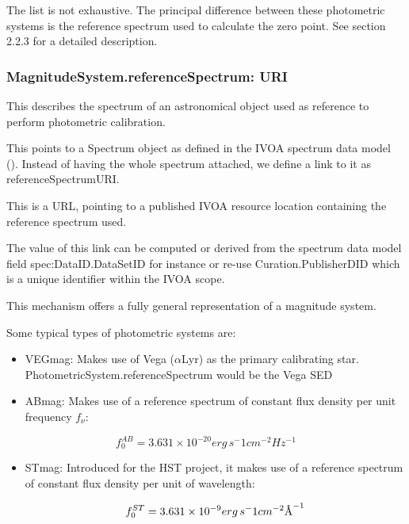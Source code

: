 \documentclass[11pt,a4paper]{ivoa}
\newcommand{\angstrom}{\mbox{\normalfont\AA}}
\begin{document}

The list is not exhaustive. The principal difference between these photometric systems is the reference spectrum used to calculate the zero point. See section 2.2.3 for a detailed description.
\par

\subsubsection{MagnitudeSystem.referenceSpectrum: URI}
This describes the spectrum of an astronomical object used as reference to perform photometric calibration.
\par

This points to a Spectrum object as defined in the IVOA spectrum data model (\cite{mcdowell2012ivoa}). Instead of having the whole spectrum attached, we define a link to it as referenceSpectrumURI.
\par

This is a URL, pointing to a published IVOA resource location containing the reference spectrum used.
\par

The value of this link can be computed or derived from the spectrum data model field spec:DataID.DataSetID for instance or re-use Curation.PublisherDID which is a unique identifier within the IVOA scope.
\par

This mechanism offers a fully general representation of a magnitude system.\par

Some typical types of photometric systems are:
\par

\begin{itemize}
	\item VEGmag: Makes use of Vega ($\alpha $Lyr) as the primary calibrating star. PhotometricSystem.referenceSpectrum would be the Vega SED\par

	\item ABmag: Makes use of a reference spectrum of constant flux density per unit frequency $f_\nu $:
\end{itemize}\par
\[
f_0^{AB} = 3.631 \times 10^{-20} erg\, s^-1 cm^{-2} Hz^{-1}
\]

\begin{itemize}
	\item STmag: Introduced for the HST project, it makes use of a reference spectrum of constant flux density per unit of wavelength:\par
\[
f_0^{ST} = 3.631 \times 10^{-9} erg\, s^-1 cm^{-2} \angstrom ^{-1}
\]
\end{itemize}
\end{document}
